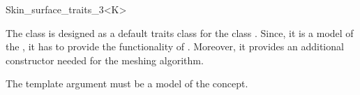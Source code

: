 
\begin{ccRefClass}{Skin_surface_traits_3<K>}
  \ccDefinition 

  The class \ccRefName is designed as a default traits class for the
  class . Since, it is a
  model of the , it has to provide the
  functionality of . Moreover, it
  provides an additional constructor needed for the meshing algorithm.
  
  The template argument  must be a model of the 
  concept.

    




  \ccIsModel 
%

\end{ccRefClass}


